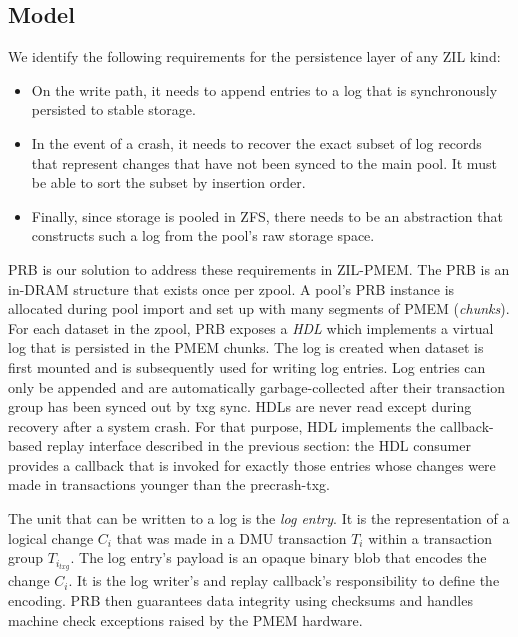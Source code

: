 \documentclass[12pt,a4paper,twoside]{book}
\begin{document}
\subsection{Model}\label{di:prb:structure}
We identify the following requirements for the persistence layer of any ZIL kind:
\begin{itemize}[noitemsep]
\item On the write path, it needs to append entries to a log that is synchronously persisted to stable storage.
\item In the event of a crash, it needs to recover the exact subset of log records that represent changes that have not been synced to the main pool.
    It must be able to sort the subset by insertion order.
\item Finally, since storage is pooled in ZFS, there needs to be an abstraction that constructs such a log from the pool's raw storage space.
\end{itemize}

PRB is our solution to address these requirements in ZIL-PMEM.
The PRB is an in-DRAM structure that exists once per zpool.
A pool's PRB instance is allocated during pool import and set up with many segments of PMEM (\textit{chunks}).
For each dataset in the zpool, PRB exposes a \textit{HDL} which implements a virtual log that is persisted in the PMEM chunks.
The log is created when dataset is first mounted and is subsequently used for writing log entries.
Log entries can only be appended and are automatically garbage-collected after their transaction group has been synced out by txg sync.
HDLs are never read except during recovery after a system crash.
For that purpose, HDL implements the callback-based replay interface described in the previous section:
the HDL consumer provides a callback that is invoked for exactly those entries whose changes were made in transactions younger than the precrash-txg.

The unit that can be written to a log is the \textit{log entry}.
It is the representation of a logical change $C_i$ that was made in a DMU transaction $T_i$ within a transaction group $T_{i_{txg}}$.
The log entry's payload is an opaque binary blob that encodes the change $C_i$.
It is the log writer's and replay callback's responsibility to define the encoding.
PRB then guarantees data integrity using checksums and handles machine check exceptions raised by the PMEM hardware.
\end{document}
